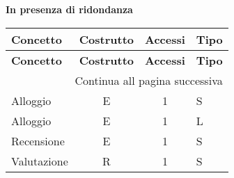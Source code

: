 \bf In presenza di ridondanza
\small
\setlength\extrarowheight{2pt}
\begin{longtable}{|l|c|c|p{6.2cm}|}
    \hline \textbf{Concetto} & \textbf{Costrutto} & \textbf{Accessi} & \textbf{Tipo}                                                                                                                         \\\hline
    \endfirsthead

    \hline \textbf{Concetto} & \textbf{Costrutto} & \textbf{Accessi} & \textbf{Tipo}                                                                                                                         \\\hline
    \endhead

    \hline \multicolumn{4}{|r|}{{Continua all pagina successiva}}                                                                                                                                             \\\hline
    \endfoot

    \hline
    \endlastfoot
    Alloggio                 & E             & 1        & S     \\\hline
    Alloggio                 & E             & 1        & L     \\\hline
    Recensione               & E             & 1        & S     \\\hline
    Valutazione              & R             & 1        & S     \\\hline
\end{longtable}
\normalsize

